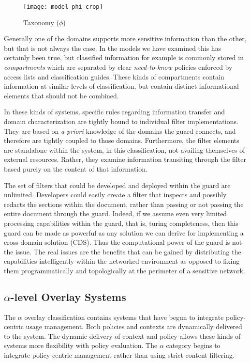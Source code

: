 \begin{figure}[!t]
\centering
\texttt{[image: model-phi-crop]}
\caption{Taxonomy ($\phi$)}
\label{fig:model:taxonomy-phi}
\end{figure}

Generally one of the domains supports more sensitive information than the other, but that is not always the case.  In the models we have examined this has certainly been true, but classified information for example  is commonly stored in \textit{compartments} which are separated by clear \textit{need-to-know} policies enforced by access lists and classification guides.  These kinds of compartments contain information at similar levels of classification, but contain distinct informational elements that should not be combined.

In these kinds of systems, specific rules regarding information transfer and domain characterization are tightly bound to individual filter implementations.  They are based on \textit{a priori} knowledge of the domains the guard connects, and therefore are tightly coupled to those domains.  Furthermore, the filter elements are standalone within the system, in this classification, not availing themselves of external resources.  Rather, they examine information transiting through the filter based purely on the content of that information.

The set of filters that could be developed and deployed within the guard are unlimited.  Developers could easily create a filter that inspects and possibly redacts the sections within the document, rather than passing or not passing the entire document through the guard.  Indeed, if we assume even very limited processing capabilities within the guard, that is, turing completeness, then this guard can be made as powerful as any solution we can derive for implementing a cross-domain solution (CDS). Thus the computational power of the guard is not the issue. The real issues are the benefits that can be gained by distributing the capabilities intelligently within the networked environment as opposed to fixing them programmatically and topologically at the perimeter of a sensitive network.

\subsection{$\alpha$-level Overlay Systems}
The $\alpha$ overlay classification contains systems that have begun to integrate policy-centric usage management. Both policies and contexts are dynamically delivered to the system. The dynamic delivery of context and policy allows these kinds of systems more flexibility with policy evaluation. The $\alpha$ category begins to integrate policy-centric management rather than using strict content filtering.

